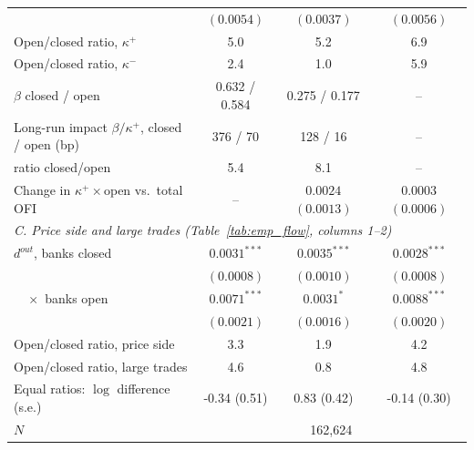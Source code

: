 \begin{tabular}{lccc}
 & $(0.0054)$ & $(0.0037)$ & $(0.0056)$ \\
Open/closed ratio, $\kappa^+$ & 5.0 & 5.2 & 6.9 \\
Open/closed ratio, $\kappa^-$ & 2.4 & 1.0 & 5.9 \\
$\beta$ closed / open & 0.632 / 0.584 & 0.275 / 0.177 & -- \\
Long-run impact $\beta/\kappa^+$, closed / open (bp) & 376 / 70 & 128 / 16 & -- \\
\quad ratio closed/open & 5.4 & 8.1 & -- \\
Change in $\kappa^+\times$open vs.\ total OFI & -- & $0.0024$ $(0.0013)$ & $0.0003$ $(0.0006)$ \\
\midrule
\multicolumn{4}{l}{\emph{C. Price side and large trades (Table~\ref{tab:emp_flow}, columns 1--2)}} \\
$d^{out}$, banks closed & $0.0031^{***}$ & $0.0035^{***}$ & $0.0028^{***}$ \\
 & $(0.0008)$ & $(0.0010)$ & $(0.0008)$ \\
$\quad\times$ banks open & $0.0071^{***}$ & $0.0031^{*}$ & $0.0088^{***}$ \\
 & $(0.0021)$ & $(0.0016)$ & $(0.0020)$ \\
Open/closed ratio, price side & 3.3 & 1.9 & 4.2 \\
Open/closed ratio, large trades & 4.6 & 0.8 & 4.8 \\
Equal ratios: $\log$ difference (s.e.) & -0.34 (0.51) & 0.83 (0.42) & -0.14 (0.30) \\
$N$ & \multicolumn{3}{c}{162,624} \\
\bottomrule
\end{tabular}
